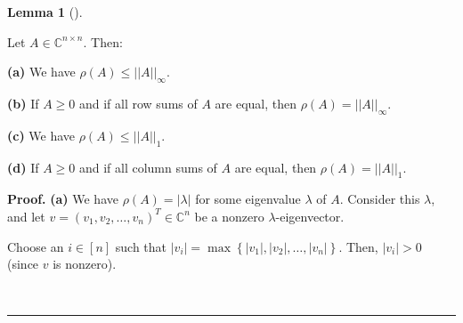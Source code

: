 \documentclass[numbers=enddot,12pt,final,onecolumn,notitlepage]{scrartcl}%
\numberwithin{exer}{subsection}
\theoremstyle{definition}
\newtheorem{lem}[theo]{Lemma}
\newenvironment{lemma}[1][]
{\begin{lem}[#1]\begin{leftbar}}
{\end{leftbar}\end{lem}}
\newenvironment{proof}[1][Proof]{\noindent\textbf{#1.} }{\ \rule{0.5em}{0.5em}}
\begin{document}
\begin{lemma}
Let $A\in\mathbb{C}^{n\times n}$. Then:

\textbf{(a)} We have $\rho\left(  A\right)  \leq\left\vert \left\vert
A\right\vert \right\vert _{\infty}$.

\textbf{(b)} If $A\geq0$ and if all row sums of $A$ are equal, then
$\rho\left(  A\right)  =\left\vert \left\vert A\right\vert \right\vert
_{\infty}$.

\textbf{(c)} We have $\rho\left(  A\right)  \leq\left\vert \left\vert
A\right\vert \right\vert _{1}$.

\textbf{(d)} If $A\geq0$ and if all column sums of $A$ are equal, then
$\rho\left(  A\right)  =\left\vert \left\vert A\right\vert \right\vert _{1}$.
\end{lemma}

\begin{proof}
\textbf{(a)} We have $\rho\left(  A\right)  =\left\vert \lambda\right\vert $
for some eigenvalue $\lambda$ of $A$. Consider this $\lambda$, and let
$v=\left(  v_{1},v_{2},\ldots,v_{n}\right)  ^{T}\in\mathbb{C}^{n}$ be a
nonzero $\lambda$-eigenvector.

Choose an $i\in\left[  n\right]  $ such that $\left\vert v_{i}\right\vert
=\max\left\{  \left\vert v_{1}\right\vert ,\left\vert v_{2}\right\vert
,\ldots,\left\vert v_{n}\right\vert \right\}  $. Then, $\left\vert
v_{i}\right\vert >0$ (since $v$ is nonzero).


\end{proof}
\end{document}

